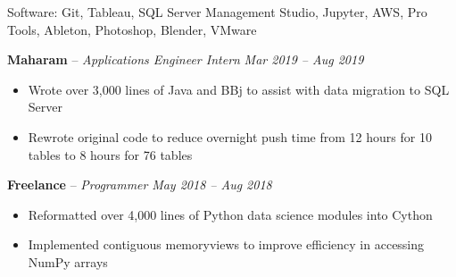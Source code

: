 \documentclass[10pt,letterpaper]{article}
\begin{document}
\inlineheadsection 
{Software:}
{Git, Tableau, SQL Server Management Studio, Jupyter, AWS, Pro Tools, Ableton, Photoshop, Blender, VMware}
\vspace{0.5em}
										
									
\spacedhrule{1em}{-1em}







\headedsection
{\textbf{Maharam} -- \textit{Applications Engineer Intern}}
{\textit{Mar 2019 -- Aug 2019}} {
	\begin{itemize}[noitemsep,nolistsep]
		\item Wrote over 3,000 lines of Java and BBj to assist with data migration to SQL Server
		\item Rewrote original code to reduce overnight push time from 12 hours for 10 tables to 8 hours for 76 tables
	\end{itemize}
}
\vspace{-1mm}


\headedsection
{\textbf{Freelance} -- \textit{Programmer}}
{\textit{May 2018 -- Aug 2018}} {
	\begin{itemize}[noitemsep,nolistsep]
		\item Reformatted over 4,000 lines of Python data science modules into Cython
		\item Implemented contiguous memoryviews to improve efficiency in accessing NumPy arrays
	\end{itemize}
}
\vspace{-1mm}
\end{document}
